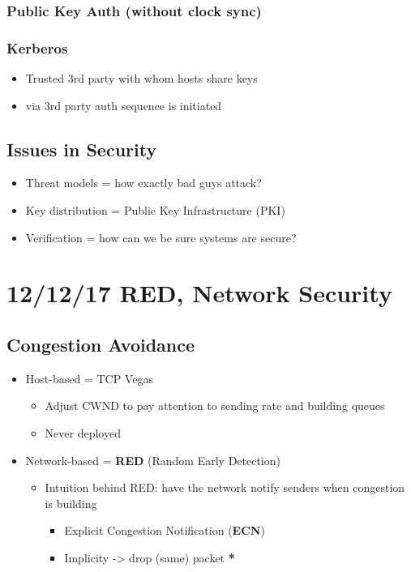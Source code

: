 \documentclass[11pt]{article}
\begin{document}
\subsubsection{Public Key Auth (without clock sync)}
\label{sec:orgheadline163}
\subsubsection{Kerberos}
\label{sec:orgheadline164}
\begin{itemize}
\item Trusted 3rd party with whom hosts share keys
\item via 3rd party auth sequence is initiated
\end{itemize}

\subsection{Issues in Security}
\label{sec:orgheadline166}
\begin{itemize}
\item Threat models = how exactly bad guys attack?
\item Key distribution = Public Key Infrastructure (PKI)
\item Verification = how can we be sure systems are secure?
\end{itemize}


\section{12/12/17 RED, Network Security}
\label{sec:orgheadline171}
\subsection{Congestion Avoidance}
\label{sec:orgheadline169}
\begin{itemize}
\item Host-based = TCP Vegas
\begin{itemize}
\item Adjust CWND to pay attention to sending rate and building queues
\item Never deployed
\end{itemize}
\item Network-based = \textbf{RED} (Random Early Detection)
\begin{itemize}
\item Intuition behind RED: have the network notify senders when
congestion is building
\begin{itemize}
\item Explicit Congestion Notification (\textbf{ECN})
\item Implicity -> drop (same) packet \textbf{*}
\end{itemize}
\end{itemize}
\end{itemize}
\end{document}
